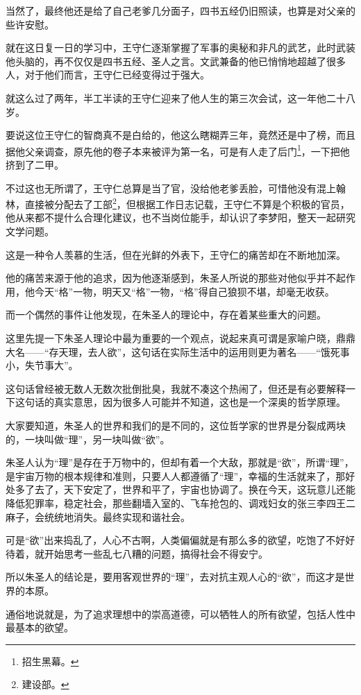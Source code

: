 \begin{multicols}{\theparacolNo}
		当然了，最终他还是给了自己老爹几分面子，四书五经仍旧照读，也算是对父亲的些许安慰。

		就在这日复一日的学习中，王守仁逐渐掌握了军事的奥秘和非凡的武艺，此时武装他头脑的，再不仅仅是四书五经、圣人之言。文武兼备的他已悄悄地超越了很多人，对于他们而言，王守仁已经变得过于强大。

		就这么过了两年，半工半读的王守仁迎来了他人生的第三次会试，这一年他二十八岁。

		要说这位王守仁的智商真不是白给的，他这么瞎糊弄三年，竟然还是中了榜，而且据他父亲调查，原先他的卷子本来被评为第一名，可是有人走了后门\footnote{招生黑幕。}，一下把他挤到了二甲。

		不过这也无所谓了，王守仁总算是当了官，没给他老爹丢脸，可惜他没有混上翰林，直接被分配去了工部\footnote{建设部。}，但根据工作日志记载，王守仁不算是个积极的官员，他从来都不提什么合理化建议，也不当岗位能手，却认识了李梦阳，整天一起研究文学问题。

		这是一种令人羡慕的生活，但在光鲜的外表下，王守仁的痛苦却在不断地加深。

		他的痛苦来源于他的追求，因为他逐渐感到，朱圣人所说的那些对他似乎并不起作用，他今天“格”一物，明天又“格”一物，“格”得自己狼狈不堪，却毫无收获。

		而一个偶然的事件让他发现，在朱圣人的理论中，存在着某些重大的问题。

		这里先提一下朱圣人理论中最为重要的一个观点，说起来真可谓是家喻户晓，鼎鼎大名——“存天理，去人欲”，这句话在实际生活中的运用则更为著名——“饿死事小，失节事大”。

		这句话曾经被无数人无数次批倒批臭，我就不凑这个热闹了，但还是有必要解释一下这句话的真实意思，因为很多人可能并不知道，这也是一个深奥的哲学原理。

		大家要知道，朱圣人的世界和我们的是不同的，这位哲学家的世界是分裂成两块的，一块叫做“理”，另一块叫做“欲”。

		朱圣人认为“理”是存在于万物中的，但却有着一个大敌，那就是“欲”，所谓“理”，是宇宙万物的根本规律和准则，只要人人都遵循了“理”，幸福的生活就来了，那好处多了去了，天下安定了，世界和平了，宇宙也协调了。换在今天，这玩意儿还能降低犯罪率，稳定社会，那些翻墙入室的、飞车抢包的、调戏妇女的张三李四王二麻子，会统统地消失。最终实现和谐社会。

		可是“欲”出来捣乱了，人心不古啊，人类偏偏就是有那么多的欲望，吃饱了不好好待着，就开始思考一些乱七八糟的问题，搞得社会不得安宁。

		所以朱圣人的结论是，要用客观世界的“理”，去对抗主观人心的“欲”，而这才是世界的本原。

		通俗地说就是，为了追求理想中的崇高道德，可以牺牲人的所有欲望，包括人性中最基本的欲望。


\end{multicols}
